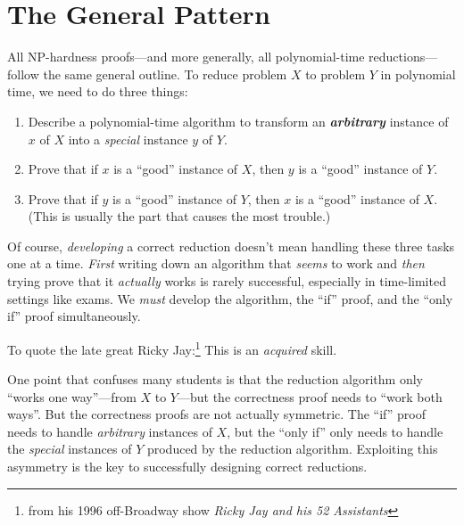 \section{The General Pattern}
\label{sec:12.8}

All NP-hardness proofs---and more generally, all polynomial-time reductions---follow the same general outline.
To reduce problem $X$ to problem $Y$ in polynomial time, we need to do three things:
\begin{enumerate}
\item Describe a polynomial-time algorithm to transform an \textbf{\textit{arbitrary}} instance of $x$ of $X$ into a \textit{special} instance $y$ of $Y$.
\item Prove that if $x$ is a “good” instance of $X$, then $y$ is a “good” instance of $Y$.
\item Prove that if $y$ is a “good” instance of $Y$, then $x$ is a “good” instance of $X$.
(This is usually the part that causes the most trouble.)
\end{enumerate}
Of course, \textit{developing} a correct reduction doesn’t mean handling these three tasks one at a time.
\textit{First} writing down an algorithm that \textit{seems} to work and \textit{then} trying prove that it \textit{actually} works is rarely successful, especially in time-limited settings like exams.
We \textit{must} develop the algorithm, the “if” proof, and the “only if” proof simultaneously.

To quote the late great Ricky Jay:\footnote{from his 1996 off-Broadway show \textit{Ricky Jay and his 52 Assistants}} This is an \textit{acquired} skill.

One point that confuses many students is that the reduction algorithm only “works one way”---from $X$ to $Y$---but the correctness proof needs to “work both ways”.
But the correctness proofs are not actually symmetric.
The “if” proof needs to handle \textit{arbitrary} instances of $X$, but the “only if” only needs to handle the \textit{special} instances of $Y$ produced by the reduction algorithm.
Exploiting this asymmetry is the key to successfully designing correct reductions.

